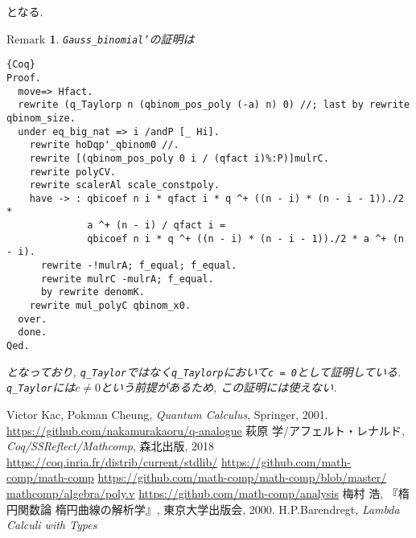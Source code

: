 \documentclass[11pt]{jarticle}
\theoremstyle{mystyle}
\newtheorem{rmk}[df]{$\textrm{Remark}$}
\newcommand{\brmk}{\begin{rmk}}
\newcommand{\ermk}{\end{rmk}}
\newcommand{\0}{\textbf{0}}
\newcommand{\1}{\textbf{1}}
\newcommand{\2}{\textbf{2}}
\begin{document}
となる. 
\brmk
{\tt Gauss\_binomial'}の証明は
\begin{lstlisting}{Coq}
Proof.
  move=> Hfact.
  rewrite (q_Taylorp n (qbinom_pos_poly (-a) n) 0) //; last by rewrite qbinom_size.
  under eq_big_nat => i /andP [_ Hi].
    rewrite hoDqp'_qbinom0 //.
    rewrite [(qbinom_pos_poly 0 i / (qfact i)%:P)]mulrC.
    rewrite polyCV.
    rewrite scalerAl scale_constpoly.
    have -> : qbicoef n i * qfact i * q ^+ ((n - i) * (n - i - 1))./2 *
              a ^+ (n - i) / qfact i =
              qbicoef n i * q ^+ ((n - i) * (n - i - 1))./2 * a ^+ (n - i).
      rewrite -!mulrA; f_equal; f_equal.
      rewrite mulrC -mulrA; f_equal.
      by rewrite denomK.
    rewrite mul_polyC qbinom_x0.
  over.
  done.
Qed. \end{lstlisting}
となっており, {\tt q\_Taylor}ではなく{\tt q\_Taylorp}において{\tt c = 0}として証明している. 
{\tt q\_Taylor}には$c \neq 0$という前提があるため, この証明には使えない. 
\ermk
\begin{thebibliography}{9}
   Victor Kac, Pokman Cheung, {\it{Quantum Calculus}}, Springer, 2001.
   \url{https://github.com/nakamurakaoru/q-analogue}
   萩原 学/アフェルト・レナルド, {\it Coq/SSReflect/Mathcomp}, 森北出版, 
    2018
   \url{https://coq.inria.fr/distrib/current/stdlib/}
   \url{https://github.com/math-comp/math-comp}
   \url{https://github.com/math-comp/math-comp/blob/master/ 
                                 mathcomp/algebra/poly.v}
   \url{https://github.com/math-comp/analysis}
   梅村 浩, 『楕円関数論  楕円曲線の解析学』, 東京大学出版会, 2000.
   H.P.Barendregt, {\it{Lambda Calculi with Types}}
\end{thebibliography}
\end{document}

